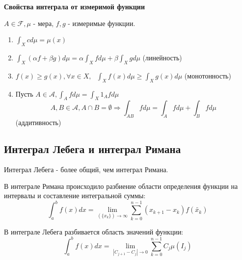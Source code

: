 \begin{center}
	\textbf{Свойства интеграла от измеримой функции}
\end{center}

$A \in \mathcal{F}, \mu$ - мера, $f, g$ - измеримые функции.
\begin{enumerate}
	\item $\int_X c d \mu = \mu (x)$
	\item $\int_X (\alpha f + \beta g) d \mu = \alpha \int_X f d \mu + \beta \int_X g d \mu$ (линейность)
	\item $f(x) \ge g(x), \forall x \in X, ~~~ \int_X f(x) d \mu \ge \int_X g(x) d \mu$ (монотонность)
	\item Пусть $A \in \mathcal{A}, \int_A f d \mu = \int_X 1_A f d \mu$
	\[ A, B \in \mathcal{A}, A \cap B = \emptyset \Rightarrow \int_{AB} f d \mu = \int_A f d \mu + \int_B f d \mu \]
	(аддитивность)
\end{enumerate}

\subsection{Интеграл Лебега и интеграл Римана}

Интеграл Лебега - более общий, чем интеграл Римана.

В интеграле Римана происходило разбиение области определения функции на интервалы и составление интегральной суммы:
\[ \int_{a}^{b} f(x) dx = \lim_{(\{x_k\}) \to \infty} \sum_{k=0}^{n-1} (x_{k+1} - x_k) f(\tilde{x_k}) \]
\begin{figure}[H]
\end{figure}

В интеграле Лебега разбивается область значений функции:
\[ \int_{a}^{b} f(x) dx = \lim_{|C_{j+1} - C_{j}| \to 0} \sum_{k=0}^{n-1} C_j \mu (I_j) \]
\begin{figure}[H]
\end{figure}

